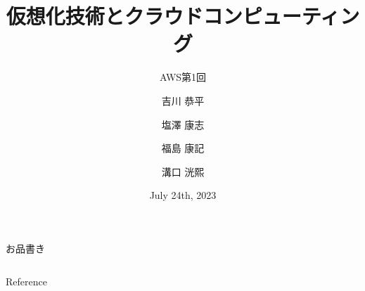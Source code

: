 \documentclass[aspectratio=43]{beamer}
\title{仮想化技術とクラウドコンピューティング}
\subtitle{AWS第1回}
\author{吉川 恭平\and 塩澤 康志\and 福島 康記\and 溝口 洸熙}
\institute{情報学群実験第4 Group C5}
\date{July 24th, 2023}
\newcommand{\stocsec}{{1-3}}
\newcommand{\ftocsec}{{4-6}}
\begin{document}
\begin{frame}
    \maketitle
\end{frame}
\begin{frame}[t]{お品書き}
    \begin{columns}[t]
        \begin{column}{.48\textwidth}
            \tableofcontents[sections=\stocsec]
        \end{column}
        \begin{column}{.48\textwidth}
            \tableofcontents[sections=\ftocsec]
        \end{column}
    \end{columns}
\end{frame}






\begin{frame}[allowframebreaks]{Reference}
    
\end{frame}
\end{document}

